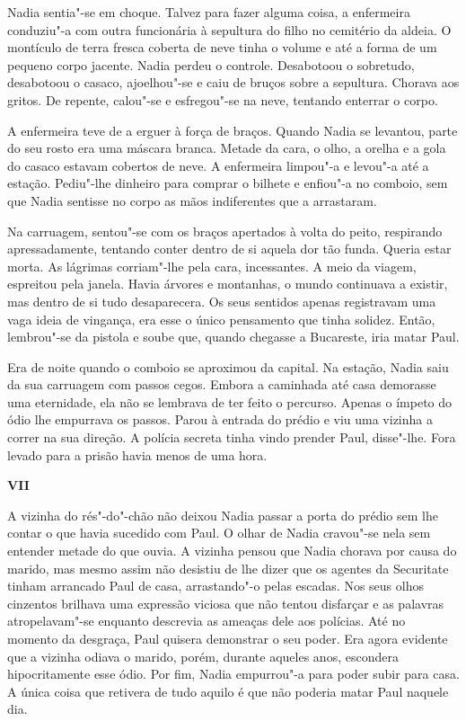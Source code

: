 Nadia sentia"-se em choque. Talvez para
fazer alguma coisa, a enfermeira conduziu"-a com outra funcionária à
sepultura do filho no cemitério da aldeia. O montículo de terra fresca
coberta de neve tinha o volume e até a forma de um pequeno corpo
jacente. Nadia perdeu o controle. Desabotoou o sobretudo, desabotoou o
casaco, ajoelhou"-se e caiu de bruços sobre a sepultura. Chorava aos
gritos. De repente, calou"-se e esfregou"-se na neve, tentando enterrar o
corpo.

A enfermeira teve de a erguer à força de braços. Quando Nadia se
levantou, parte do seu rosto era uma máscara branca. Metade da cara, o
olho, a orelha e a gola do casaco estavam cobertos de neve. A enfermeira
limpou"-a e levou"-a até a estação. Pediu"-lhe dinheiro para comprar o
bilhete e enfiou"-a no comboio, sem que Nadia sentisse no corpo as mãos
indiferentes que a arrastaram.

Na carruagem, sentou"-se com os braços apertados à volta do peito,
respirando apressadamente, tentando conter dentro de si aquela dor tão
funda. Queria estar morta. As lágrimas corriam"-lhe pela cara,
incessantes. A meio da viagem, espreitou pela janela. Havia árvores e
montanhas, o mundo continuava a existir, mas dentro de si tudo desaparecera. Os seus sentidos apenas registravam uma vaga ideia de vingança,
era esse o único pensamento que tinha solidez. Então, lembrou"-se da
pistola e soube que, quando chegasse a Bucareste, iria matar Paul.

Era de noite quando o comboio se aproximou da capital. Na estação, Nadia
saiu da sua carruagem com passos cegos. Embora a caminhada até casa %
demorasse uma eternidade, ela não se lembrava de ter feito o percurso.
Apenas o ímpeto do ódio lhe empurrava os passos. Parou à entrada do
prédio e viu uma vizinha a correr na sua direção. A polícia secreta
tinha vindo prender Paul, disse"-lhe. Fora levado para a prisão havia
menos de uma hora.

\pagebreak
\thispagestyle{empty}
\movetooddpage
\vspace*{1.8cm}
\noindent{}\textbf{VII}

\bigskip

\noindent{}A vizinha do rés"-do"-chão não deixou Nadia passar a porta do prédio sem
lhe contar o que havia sucedido com Paul. O olhar de Nadia cravou"-se
nela sem entender metade do que ouvia. A vizinha pensou que Nadia
chorava por causa do marido, mas mesmo assim não desistiu de lhe dizer
que os agentes da Securitate tinham arrancado Paul de casa, arrastando"-o
pelas escadas. Nos seus olhos cinzentos brilhava uma expressão viciosa
que não tentou disfarçar e as palavras atropelavam"-se enquanto
descrevia as ameaças dele aos polícias. Até no momento da desgraça, Paul
quisera demonstrar o seu poder. Era agora evidente que a vizinha odiava
o marido, porém, durante aqueles anos, escondera hipocritamente esse
ódio. Por fim, Nadia empurrou"-a para poder subir para casa. A única
coisa que retivera de tudo aquilo é que não poderia matar Paul naquele
dia.

